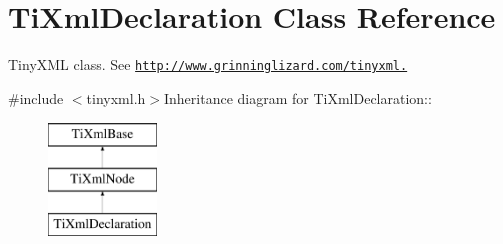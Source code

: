 \hypertarget{class_ti_xml_declaration}{
\section{TiXmlDeclaration Class Reference}
\label{class_ti_xml_declaration}
}


TinyXML class. See \href{http://www.grinninglizard.com/tinyxml.}{\tt http://www.grinninglizard.com/tinyxml.}  


{\ttfamily \#include $<$tinyxml.h$>$}Inheritance diagram for TiXmlDeclaration::\begin{figure}[H]
\begin{center}
\leavevmode
\includegraphics[height=3cm]{class_ti_xml_declaration}
\end{center}
\end{figure}
